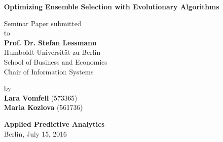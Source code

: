 \begin{center}

    {\Large{\bf Optimizing Ensemble Selection with Evolutionary Algorithms}} \vspace{0.5cm}


    {\normalsize Seminar Paper submitted\\\vspace{0.5cm}
    to}\\\vspace{0.5cm}
    {\normalsize{\bf Prof. Dr. Stefan Lessmann}} \\\vspace{0.5cm}
    {\normalsize Humboldt-Universit\"at zu Berlin \\
    School of Business and Economics \\
    Chair of Information Systems} \vspace{1cm}


    {\normalsize by \\\vspace{0.5cm}
    	{\bf Lara Vomfell} (573365)\\
    	{\bf Maria Kozlova} (561736)
    } \vspace{1cm}
    
    
    {\normalsize 
    	{\bf Applied Predictive Analytics} \\
    	Berlin, July 15, 2016}

\end{center}
